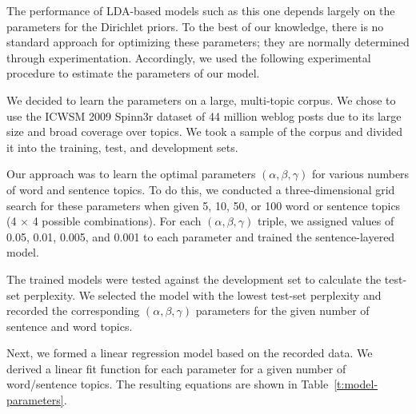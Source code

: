 The performance of LDA-based models such as this one depends largely on the
parameters for the Dirichlet priors.  To the best of our knowledge, there is no
standard approach for optimizing these parameters; they are normally determined
through experimentation.  Accordingly, we used the following experimental
procedure to estimate the parameters of our model.

We decided to learn the parameters on a large, multi-topic corpus.  We chose to
use the ICWSM 2009 Spinn3r dataset of 44 million weblog posts
\cite{burton2009icwsm} due to its large size and broad coverage over topics.
We took a sample of the corpus and divided it into the training, test, and
development sets.

Our approach was to learn the optimal parameters $(\alpha, \beta, \gamma)$ for
various numbers of word and sentence topics.  To do this, we conducted a
three-dimensional grid search for these parameters when given 5, 10, 50, or 100
word or sentence topics (4 $\times$ 4 possible combinations).  For each
$(\alpha, \beta, \gamma)$ triple, we assigned values of 0.05, 0.01, 0.005, and
0.001 to each parameter and trained the sentence-layered model.  

The trained models were tested against the development set to calculate the
test-set perplexity.  We selected the model with the lowest test-set perplexity
and recorded the corresponding $(\alpha, \beta, \gamma)$ parameters for the
given number of sentence and word topics.

Next, we formed a linear regression model based on the recorded data.  We
derived a linear fit function for each parameter for a given number of
word/sentence topics.  The resulting equations are shown in
Table~\ref{t:model-parameters}.

